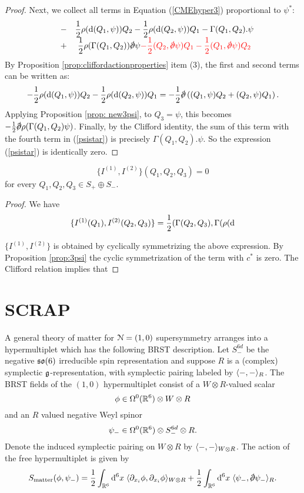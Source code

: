 \documentclass[10pt, oneside]{article}
\begin{document}
\begin{proof}
Next, we collect all terms in Equation (\ref{CMEhyper3}) proportional to $\psi^*$:
\begin{equation}\label{psistar}
\begin{array}{cccc}
& - & \displaystyle \frac{1}{2} \rho(\d(Q_1,\psi))Q_2 - \frac{1}{2} \rho(\d(Q_2, \psi)) Q_1 - \Gamma(Q_1,Q_2) . \psi
\\ 
& + &\displaystyle \frac{1}{2} \rho(\Gamma(Q_1,Q_2)) \sd \dd \psi \textcolor{red}{ - \frac{1}{2} (Q_2, \sd \dd \psi)Q_1 - \frac{1}{2} (Q_1, \sd \dd \psi)Q_2}
\end{array}
\end{equation}
By Proposition \ref{prop:cliffordactionproperties} item (3), the first and second terms can be written as:
\[
- \frac{1}{2} \rho(\d(Q_1,\psi))Q_2 - \frac{1}{2} \rho(\d(Q_2, \psi)) Q_1 = - \frac{1}{2} \sd \dd \left( (Q_1, \psi)Q_2 + (Q_2 , \psi)Q_1 \right).
\]
Applying Proposition \ref{prop: new3psi}, to $Q_3 = \psi$, this becomes $-\frac{1}{2} \sd \dd \rho(\Gamma(Q_1,Q_2) \psi)$. 
Finally, by the Clifford identity, the sum of this term with the fourth term in (\ref{psistar}) is precisely $\Gamma(Q_1,Q_2) . \psi$.
So the expression (\ref{psistar}) is identically zero. 
\end{proof}

\begin{lemma}
\[\{I^{(1)}, I^{(2)}\}(Q_1, Q_2, Q_3) = 0\]
for every $Q_1, Q_2, Q_3\in S_+ \oplus S_-$.
\end{lemma}
\begin{proof}
We have
\begin{align*}
\{I^{(1)}(Q_1), I^{(2)}(Q_2, Q_3)\} = \frac{1}{2} (\Gamma(Q_2, Q_3), \Gamma(\rho({\rm d}
\end{align*}

$\{I^{(1)}, I^{(2)}\}$ is obtained by cyclically symmetrizing the above expression. By Proposition \ref{prop:3psi} the cyclic symmetrization of the term with $c^*$ is zero. The Clifford relation implies that

\end{proof}
\newpage

\section{SCRAP}

A general theory of matter for $\mathcal N = (1,0)$ supersymmetry arranges into a hypermultiplet which has the following BRST description.
Let $S_-^{6d}$ be the negative $\mathfrak{so}(6)$ irreducible spin representation and suppose $R$ is a (complex) symplectic $\mathfrak g$-representation, with symplectic pairing labeled by $\langle-,-\rangle_R$. 
The BRST fields of the $(1,0)$ hypermultiplet consist of a $W \otimes R$-valued scalar
\[
\phi \in \Omega^0(\mathbb R^6) \otimes W \otimes R
\]
and an $R$ valued negative Weyl spinor
\[
\psi_- \in \Omega^0(\mathbb R^6) \otimes S_-^{6d} \otimes R .
\]
Denote the induced symplectic pairing on $W \otimes R$ by $\langle-,-\rangle_{W \otimes R}$. 
The action of the free hypermultiplet is given by
\[
S_{\rm matter} (\phi, \psi_-) = \frac{1}{2} \int_{\RR^6} \d^6 x \; \<\partial_{x_i} \phi , \partial_{x_i} \phi\>_{W \otimes R} + \frac{1}{2} \int_{\RR^6} \d^6 x \;\<\psi_-, \sd \dd \psi_-\>_R .
\]
\end{document}
